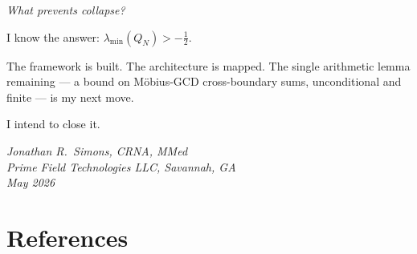 \documentclass[12pt]{article}
\newcommand{\half}{\tfrac{1}{2}}
\begin{document}
\emph{What prevents collapse?}

I know the answer: $\lambda_{\min}(Q_N) > -\half$.

The framework is built.
The architecture is mapped.
The single arithmetic lemma remaining --- a bound on
M\"{o}bius-GCD cross-boundary sums, unconditional and finite ---
is my next move.

I intend to close it.

\bigskip
\noindent\textit{Jonathan R.\ Simons, CRNA, MMed\\
Prime Field Technologies LLC, Savannah, GA\\
May 2026}

\section*{References}
\end{document}
